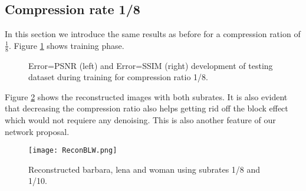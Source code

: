 \FloatBarrier

\subsection{Compression rate 1/8}

In this section we introduce the same results as before for a compression ration of $\frac{1}{8}$. Figure \ref{fig:trainTestsub1-8} shows training phase. 

\begin{figure}[!htb] 
\centering 
{} 
\caption[PSNR and SSIM traning for compression ratio 1/8.]{\color{red}Error=PSNR \color{black}(left) and \color{red}Error=SSIM \color{black}(right) development of testing dataset during training for compression ratio 1/8.}
\label{fig:trainTestsub1-8}
\end{figure}

\FloatBarrier

Figure \ref{fig:ReconBLW} shows the reconstructed images with both subrates. It is also evident that decreasing the compression ratio also helps getting rid off the block effect which would not requiere any denoising. This is also another feature of our network proposal.  

\begin{figure}[!htb] 
\centering 
\texttt{[image: ReconBLW.png]}
\caption{Reconstructed barbara, lena and woman using subrates 1/8 and 1/10.}
\label{fig:ReconBLW} 
\end{figure}


